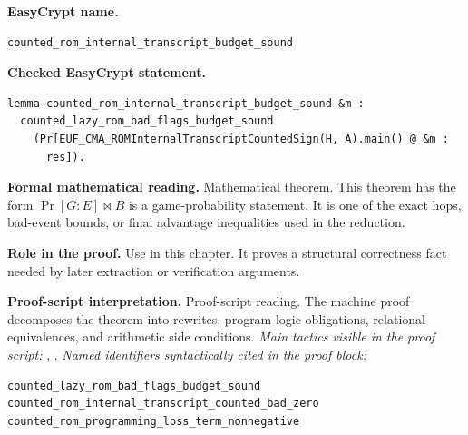 \begin{formaltheorem}
\noindent\textbf{EasyCrypt name.}
\begin{lstlisting}[language=EasyCrypt,basicstyle=\ttfamily\scriptsize]
counted_rom_internal_transcript_budget_sound
\end{lstlisting}
\noindent\textbf{Checked EasyCrypt statement.}
\begin{lstlisting}[language=EasyCrypt,basicstyle=\ttfamily\scriptsize]
lemma counted_rom_internal_transcript_budget_sound &m :
  counted_lazy_rom_bad_flags_budget_sound
    (Pr[EUF_CMA_ROMInternalTranscriptCountedSign(H, A).main() @ &m :
      res]).
\end{lstlisting}
\noindent\textbf{Formal mathematical reading.}
Mathematical theorem. This theorem has the form \(\Pr[G:E] \bowtie B\) is a game-probability statement.  It is one of the exact hops, bad-event bounds, or final advantage inequalities used in the reduction.

\noindent\textbf{Role in the proof.}
Use in this chapter. It proves a structural correctness fact needed by later extraction or verification arguments.

\noindent\textbf{Proof-script interpretation.}
Proof-script reading. The machine proof decomposes the theorem into rewrites, program-logic obligations, relational equivalences, and arithmetic side conditions.
\emph{Main tactics visible in the proof script:} , .
\emph{Named identifiers syntactically cited in the proof block:}
\begin{lstlisting}[language=EasyCrypt,basicstyle=\ttfamily\scriptsize]
counted_lazy_rom_bad_flags_budget_sound
counted_rom_internal_transcript_counted_bad_zero
counted_rom_programming_loss_term_nonnegative
\end{lstlisting}

\end{formaltheorem}

